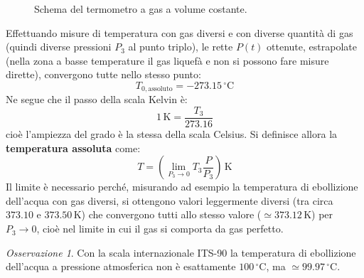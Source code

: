 \documentclass[11pt, a4paper, openright]{book}
\theoremstyle{plain}
\theoremstyle{definition}
\theoremstyle{remark}
\newtheorem{osservazione}[teorema]{Osservazione}
\begin{document}
\begin{figure}[H]
    \centering
    \caption{Schema del termometro a gas a volume costante.}
\end{figure}

Effettuando misure di temperatura con gas diversi e con diverse quantità di gas (quindi diverse pressioni $P_3$ al punto triplo), le rette $P(t)$ ottenute, estrapolate (nella zona a basse temperature il gas liquefà e non si possono fare misure dirette), convergono tutte nello stesso punto:
\begin{equation}
    T_{0, \text{assoluto}} = -273.15\,^\circ\text{C}
\end{equation}
Ne segue che il passo della scala Kelvin è:
\begin{equation}
    1\,\text{K} = \frac{T_3}{273.16}
\end{equation}
cioè l'ampiezza del grado è la stessa della scala Celsius. Si definisce allora la \textbf{temperatura assoluta} come:
\begin{equation}
    T = \left(\lim_{P_3 \to 0} T_3\frac{P}{P_3}\right)\,\text{K}
\end{equation}
Il limite è necessario perché, misurando ad esempio la temperatura di ebollizione dell'acqua con gas diversi, si ottengono valori leggermente diversi (tra circa $373.10$ e $373.50\,\text{K}$) che convergono tutti allo stesso valore ($\simeq 373.12\,\text{K}$) per $P_3 \to 0$, cioè nel limite in cui il gas si comporta da gas perfetto.

\begin{osservazione}
    Con la scala internazionale ITS-90 la temperatura di ebollizione dell'acqua a pressione atmosferica non è esattamente $100\,^\circ\text{C}$, ma $\simeq 99.97\,^\circ\text{C}$.
\end{osservazione}
\end{document}
